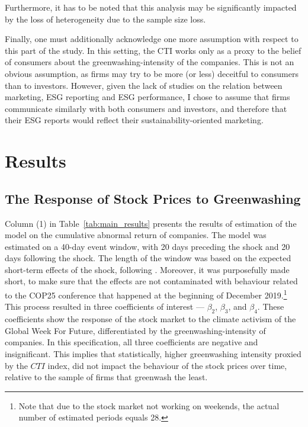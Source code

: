 \documentclass[12pt]{article}
\begin{document}
Furthermore, it has to be noted that this analysis may be significantly impacted by the loss of heterogeneity due to the sample size loss.  

Finally, one must additionally acknowledge one more assumption with respect to this part of the study. In this setting, the CTI works only as a proxy to the belief of consumers about the greenwashing-intensity of the companies. This is not an obvious assumption, as firms may try to be more (or less) deceitful to consumers than to investors. However, given the lack of studies on the relation between marketing, ESG reporting and ESG performance, I chose to assume that firms communicate similarly with both consumers and investors, and therefore that their ESG reports would reflect their sustainability-oriented marketing. 


\section{Results}\label{sect:results}


\subsection{The Response of Stock Prices to Greenwashing}\label{subsect:stocks}

Column (1) in Table~\ref{tab:main_results} presents the results of estimation of the model on the cumulative abnormal return of companies. The model was estimated on a 40-day event window, with 20 days preceding the shock and 20 days following the shock. The length of the window was based on the expected short-term effects of the shock, following \textcite{schusterStockPriceReactions2023}. Moreover, it was purposefully made short, to make sure that the effects are not contaminated with behaviour related to the COP25 conference that happened at the beginning of December 2019.\footnote{Note that due to the stock market not working on weekends, the actual number of estimated periods equals 28.} This process resulted in three coefficients of interest --- $\beta_2$, $\beta_3$, and $\beta_4$. These coefficients show the response of the stock market to the climate activism of the Global Week For Future, differentiated by the greenwashing-intensity of companies. In this specification, all three coefficients are negative and insignificant. This implies that statistically, higher greenwashing intensity proxied by the $CTI$ index, did not impact the behaviour of the stock prices over time, relative to the sample of firms that greenwash the least. 
\end{document}
